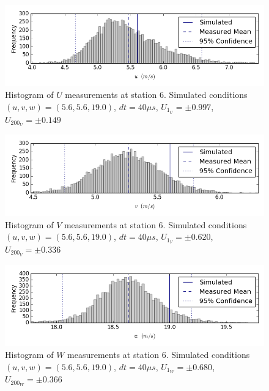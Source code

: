 \begin{figure}[H]
\centering
\includegraphics[width=6in]{figs/Ely_May28th06002/uncertainty_Ely_May28th06002_U}
\caption{Histogram of $U$ measurements at station 6. Simulated conditions $(u,v,w)=(5.6, 5.6, 19.0)$, $dt=40 \mu s$, $U_1_U=\pm 0.997$, $U_200_U=\pm 0.149$}
\label{fig:uncertainty_Ely_May28th06002_U}
\end{figure}


\begin{figure}[H]
\centering
\includegraphics[width=6in]{figs/Ely_May28th06002/uncertainty_Ely_May28th06002_V}
\caption{Histogram of $V$ measurements at station 6. Simulated conditions $(u,v,w)=(5.6, 5.6, 19.0)$, $dt=40 \mu s$, $U_1_V=\pm 0.620$, $U_200_V=\pm 0.336$}
\label{fig:uncertainty_Ely_May28th06002_V}
\end{figure}


\begin{figure}[H]
\centering
\includegraphics[width=6in]{figs/Ely_May28th06002/uncertainty_Ely_May28th06002_W}
\caption{Histogram of $W$ measurements at station 6. Simulated conditions $(u,v,w)=(5.6, 5.6, 19.0)$, $dt=40 \mu s$, $U_1_W=\pm 0.680$, $U_200_W=\pm 0.366$}
\label{fig:uncertainty_Ely_May28th06002_W}
\end{figure}


